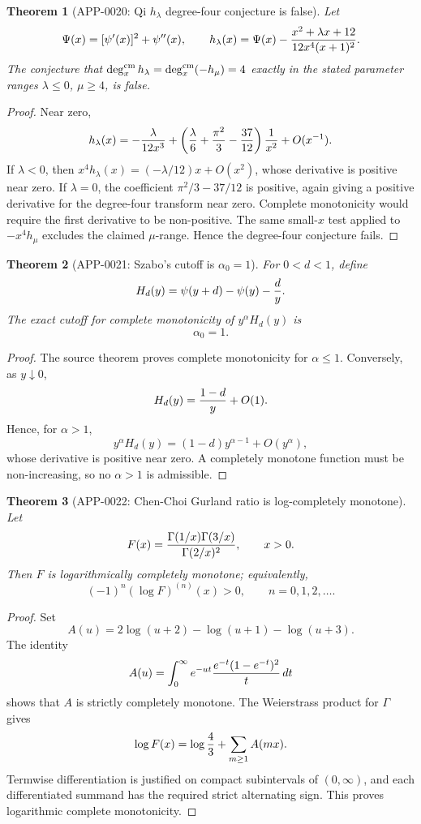\documentclass[11pt]{article}
\numberwithin{equation}{section}
\newtheorem{theorem}{Theorem}[section]
\theoremstyle{definition}
\theoremstyle{remark}
\newcommand{\1}{\mathbf 1}
\begin{document}
\begin{theorem}[APP-0020: Qi \(h_\lambda\) degree-four conjecture is false]
\label{thm:app20-qi-hlambda}
Let
\[
  \Psi(x)=[\psi'(x)]^2+\psi''(x),\qquad
  h_\lambda(x)=\Psi(x)-
   {x^2+\lambda x+12\over 12x^4(x+1)^2}.
\]
The conjecture that
\(\deg_x^{\rm cm}h_\lambda=\deg_x^{\rm cm}(-h_\mu)=4\) exactly in the stated
parameter ranges \(\lambda\le0\), \(\mu\ge4\), is false.
\end{theorem}

\begin{proof}
Near zero,
\[
 h_\lambda(x)=-{\lambda\over 12x^3}
 +\left({\lambda\over6}+{\pi^2\over3}-{37\over12}\right){1\over x^2}
 +O(x^{-1}).
\]
If \(\lambda<0\), then \(x^4h_\lambda(x)=(-\lambda/12)x+O(x^2)\), whose
derivative is positive near zero.  If \(\lambda=0\), the coefficient
\(\pi^2/3-37/12\) is positive, again giving a positive derivative for the
degree-four transform near zero.  Complete monotonicity would require the first
derivative to be non-positive.  The same small-\(x\) test applied to
\(-x^4h_\mu\) excludes the claimed \(\mu\)-range.  Hence the degree-four
conjecture fails.
\end{proof}

\begin{theorem}[APP-0021: Szabo's cutoff is \(\alpha_0=1\)]
\label{thm:app21-szabo-cutoff}
For \(0<d<1\), define
\[
  H_d(y)=\psi(y+d)-\psi(y)-{d\over y}.
\]
The exact cutoff for complete monotonicity of \(y^\alpha H_d(y)\) is
\[
  \alpha_0=1 .
\]
\end{theorem}

\begin{proof}
The source theorem proves complete monotonicity for \(\alpha\le1\).  Conversely,
as \(y\downarrow0\),
\[
  H_d(y)={1-d\over y}+O(1).
\]
Hence, for \(\alpha>1\),
\[
  y^\alpha H_d(y)=(1-d)y^{\alpha-1}+O(y^\alpha),
\]
whose derivative is positive near zero.  A completely monotone function must be
non-increasing, so no \(\alpha>1\) is admissible.
\end{proof}

\begin{theorem}[APP-0022: Chen-Choi Gurland ratio is log-completely monotone]
\label{thm:app22-gurland-logcm}
Let
\[
  F(x)={\Gamma(1/x)\Gamma(3/x)\over \Gamma(2/x)^2},\qquad x>0.
\]
Then \(F\) is logarithmically completely monotone; equivalently,
\[
  (-1)^n(\log F)^{(n)}(x)>0,\qquad n=0,1,2,\ldots .
\]
\end{theorem}

\begin{proof}
Set
\[
  A(u)=2\log(u+2)-\log(u+1)-\log(u+3).
\]
The identity
\[
 A(u)=\int_0^\infty e^{-ut}{e^{-t}(1-e^{-t})^2\over t}\,dt
\]
shows that \(A\) is strictly completely monotone.  The Weierstrass product for
\(\Gamma\) gives
\[
  \log F(x)=\log {4\over3}+\sum_{m\ge1}A(mx).
\]
Termwise differentiation is justified on compact subintervals of
\((0,\infty)\), and each differentiated summand has the required strict
alternating sign.  This proves logarithmic complete monotonicity.
\end{proof}
\end{document}
